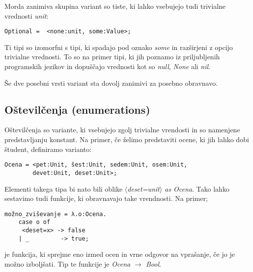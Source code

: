 \documentclass[12pt,a4paper,openany]{book}
\begin{document}
Morda zanimiva skupina variant so tiste, ki lahko vsebujejo tudi trivialne vrednosti \emph{unit}:
\begin{lstlisting}
Optional =  <none:unit, some:Value>;
\end{lstlisting}
Ti tipi so izomorfni s tipi, ki spadajo pod oznako \emph{some} in razširjeni z opcijo trivialne vrednosti. To so na primer tipi, ki jih poznamo iz priljubljenih programskih jezikov in dopuščajo 
vrednosti kot so \emph{null}, \emph{None} ali \emph{nil}.

Še dve posebni vrsti variant sta dovolj zanimivi za posebno obravnavo.

\subsection{Oštevilčenja (enumerations)}
Oštevilčenja so variante, ki vsebujejo zgolj trivialne vrendosti in so namenjene predstavljanju konstant. Na primer, če želimo predstaviti ocene, ki jih lahko dobi študent, definiramo varianto:
\begin{lstlisting}
Ocena = <pet:Unit, šest:Unit, sedem:Unit, osem:Unit, 
        devet:Unit, deset:Unit>;
\end{lstlisting}
Elementi takega tipa bi nato bili oblike \emph{$\langle$deset=unit$\rangle$ as Ocena}. Tako lahko sestavimo tudi funkcije, ki obravnavajo take vrendnosti. Na primer;
\begin{lstlisting}
možno_zviševanje = λ.o:Ocena.
    case o of 
     <deset=x> -> false
    | _         -> true;
\end{lstlisting}
je funkcija, ki sprejme eno izmed ocen in vrne odgovor na vprašanje, če jo je možno izboljšati. Tip te funkcije je \emph{Ocena $\rightarrow$ Bool}.
\end{document}
